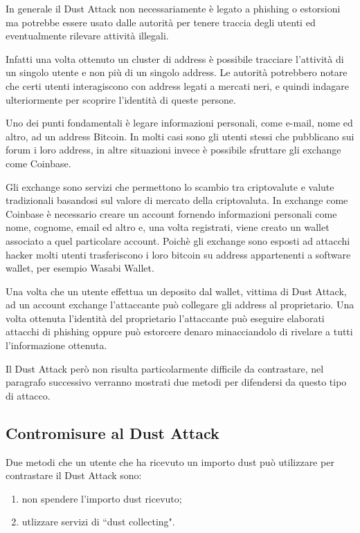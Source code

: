 In generale il Dust Attack non necessariamente è legato a phishing o estorsioni ma potrebbe essere usato dalle autorità per tenere traccia degli utenti ed eventualmente rilevare attività illegali.

Infatti una volta ottenuto un cluster di address è possibile tracciare l'attività di un singolo utente e non più di un singolo address. Le autorità potrebbero notare che certi utenti interagiscono con address legati a mercati neri, e quindi indagare ulteriormente per scoprire l'identità di queste persone.

Uno dei punti fondamentali è legare informazioni personali, come e-mail, nome ed altro, ad un address Bitcoin. In molti casi sono gli utenti stessi che pubblicano sui forum i loro address, in altre situazioni invece è possibile sfruttare gli exchange come Coinbase.

Gli exchange sono servizi che permettono lo scambio tra criptovalute e valute tradizionali basandosi sul valore di mercato della criptovaluta. In exchange come Coinbase è necessario creare un account fornendo informazioni personali come nome, cognome, email ed altro e, una volta registrati, viene creato un wallet associato a quel particolare account. Poichè gli exchange sono esposti ad attacchi hacker molti utenti trasferiscono i loro bitcoin su address appartenenti a software wallet, per esempio Wasabi Wallet.

Una volta che un utente effettua un deposito dal wallet, vittima di Dust Attack, ad un account exchange l'attaccante può collegare gli address al proprietario. Una volta ottenuta l'identità del proprietario l'attaccante può eseguire elaborati attacchi di phishing oppure può estorcere denaro minacciandolo di rivelare a tutti l'informazione ottenuta. 

Il Dust Attack però non risulta particolarmente difficile da contrastare, nel paragrafo successivo verranno mostrati due metodi per difendersi da questo tipo di attacco.
\subsection{Contromisure al Dust Attack}
Due metodi che un utente che ha ricevuto un importo dust può utilizzare per contrastare il Dust Attack sono:
    \begin{enumerate}
        \item non spendere l'importo dust ricevuto; 
        \item utlizzare servizi di ``dust collecting". 
    \end{enumerate}
    

